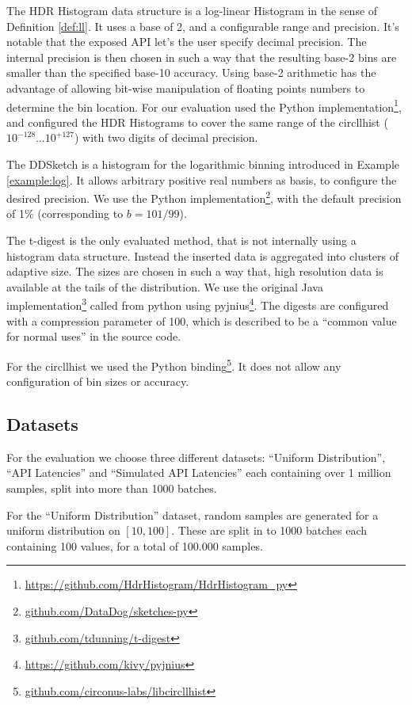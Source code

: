 \documentclass{article}
\theoremstyle{plain}
\theoremstyle{remark}
\begin{document}
The HDR Histogram data structure is a log-linear Histogram in the sense of Definition \ref{def:ll}.
It uses a base of 2, and a configurable range and precision.  It's notable that the exposed API
let's the user specify decimal precision.  The internal precision is then chosen in such a way that
the resulting base-2 bins are smaller than the specified base-10 accuracy.  Using base-2 arithmetic
has the advantage of allowing bit-wise manipulation of floating points numbers to determine the bin
location. For our evaluation used the Python
implementation\footnote{\url{https://github.com/HdrHistogram/HdrHistogram_py}}, and configured the
HDR Histograms to cover the same range of the circllhist ($10^{-128}\dots10^{+127}$) with two digits
of decimal precision.

The DDSketch is a histogram for the logarithmic binning introduced in Example \ref{example:log}.
It allows arbitrary positive real numbers as basis, to configure the desired precision.
We use the Python implementation\footnote{\url{github.com/DataDog/sketches-py}}, with the default
precision of 1\% (corresponding to $b=101/99$).

The t-digest is the only evaluated method, that is not internally using a histogram data structure.
Instead the inserted data is aggregated into clusters of adaptive size.  The sizes are chosen in
such a way that, high resolution data is available at the tails of the distribution.  We use the
original Java implementation\footnote{\url{github.com/tdunning/t-digest}} called from python
using pyjnius\footnote{\url{https://github.com/kivy/pyjnius}}. The digests are configured with a
compression parameter of 100, which is described to be a ``common value for normal uses'' in
the source code.

For the circllhist we used the Python binding\footnote{\url{github.com/circonus-labs/libcircllhist}}.
It does not allow any configuration of bin sizes or accuracy.

\subsection{Datasets}

For the evaluation we choose three different datasets: ``Uniform Distribution'', ``API Latencies'' and ``Simulated API Latencies''
each containing over 1 million samples, split into more than 1000 batches.

For the ``Uniform Distribution'' dataset, random samples are generated for a uniform distribution on $[10,100]$.
These are split in to 1000 batches each containing 100 values, for a total of 100.000 samples.
\end{document}
